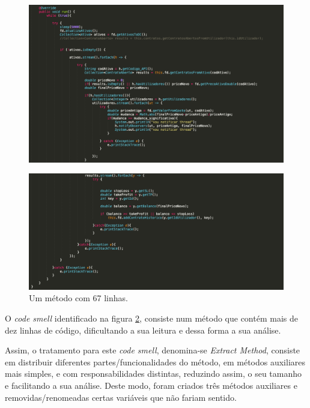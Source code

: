 \begin{figure}[H]
	\centering
	\includegraphics[scale=0.40]{images/bloaters/long-method/b2-1-1.png}
	\label{img:long-method-1}
\end{figure}

\begin{figure}[H]
	\centering
	\includegraphics[scale=0.40]{images/bloaters/long-method/b2-1-2.png}
	\caption{Um método com 67 linhas.}
	\label{img:long-method-2}
\end{figure}

\hspace{5mm} O \emph{code smell} identificado na figura \ref{img:long-method-2}, consiste num método que contém mais de dez linhas de código, dificultando a sua leitura e dessa forma a sua análise. 

\hspace{5mm} Assim, o tratamento para este \emph{code smell}, denomina-se \emph{Extract Method}, consiste em distribuir diferentes partes/funcionalidades do método, em métodos auxiliares mais simples, e com responsabilidades distintas, reduzindo assim, o seu tamanho e facilitando a sua análise. Deste modo, foram criados três métodos auxiliares e removidas/renomeadas certas variáveis que não fariam sentido.

